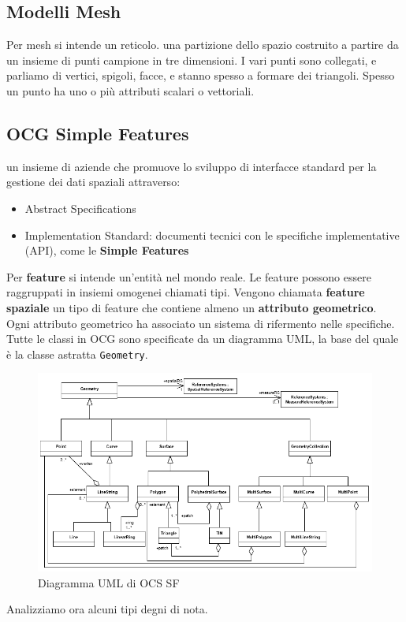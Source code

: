 \documentclass[a4paper,12pt]{article}
\begin{document}
\subsection{Modelli Mesh}
Per mesh si intende un reticolo. \E una partizione dello spazio costruito a partire da un insieme di punti campione in tre dimensioni. I vari punti sono collegati, e parliamo di vertici, spigoli, facce, e stanno spesso a formare dei triangoli. Spesso un punto ha uno o più attributi scalari o vettoriali.

\subsection{OCG Simple Features}
\E un insieme di aziende che promuove lo sviluppo di interfacce standard per la gestione dei dati spaziali attraverso:
\begin{itemize}
\item Abstract Specifications
\item Implementation Standard: documenti tecnici con le specifiche implementative (API), come le \textbf{Simple Features}
\end{itemize}
Per \textbf{feature} si intende un'entità nel mondo reale. Le feature possono essere raggruppati in insiemi omogenei chiamati tipi.
Vengono chiamata \textbf{feature spaziale} un tipo di feature che contiene almeno un \textbf{attributo geometrico}.\\
Ogni attributo geometrico ha associato un sistema di rifermento nelle specifiche.\\
Tutte le classi in OCG sono specificate da un diagramma UML, la base del quale è la classe astratta \texttt{Geometry}.
\begin{figure}[H]
	\centering
	\includegraphics[width=1.2\linewidth]{Immagini/UMLGIS}
	\caption{Diagramma UML di OCS SF}
\end{figure}
Analizziamo ora alcuni tipi degni di nota.
\end{document}
